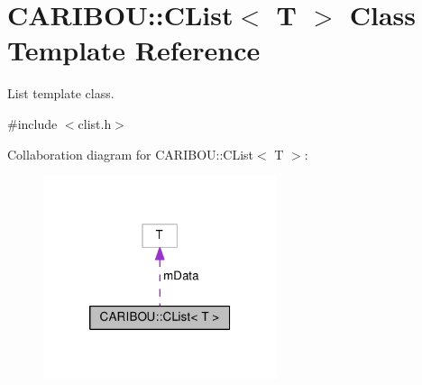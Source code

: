 \section{C\-A\-R\-I\-B\-O\-U\-:\-:C\-List$<$ T $>$ Class Template Reference}
\label{class_c_a_r_i_b_o_u_1_1_c_list}


List template class.  




{\ttfamily \#include $<$clist.\-h$>$}



Collaboration diagram for C\-A\-R\-I\-B\-O\-U\-:\-:C\-List$<$ T $>$\-:\nopagebreak
\begin{figure}[H]
\begin{center}
\leavevmode
\includegraphics[width=194pt]{class_c_a_r_i_b_o_u_1_1_c_list__coll__graph}
\end{center}
\end{figure}
